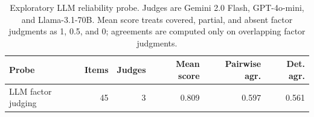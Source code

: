 \begin{table}[t]
\centering
\scriptsize
\caption{Exploratory LLM reliability probe. Judges are Gemini 2.0 Flash, GPT-4o-mini, and Llama-3.1-70B. Mean score treats covered, partial, and absent factor judgments as 1, 0.5, and 0; agreements are computed only on overlapping factor judgments.}
\label{tab:llm-reliability}
\begin{tabular}{lrrrrr}
\toprule
Probe & Items & Judges & Mean score & Pairwise agr. & Det. agr. \\
\midrule
LLM factor judging & 45 & 3 & 0.809 & 0.597 & 0.561 \\
\bottomrule
\end{tabular}
\end{table}
